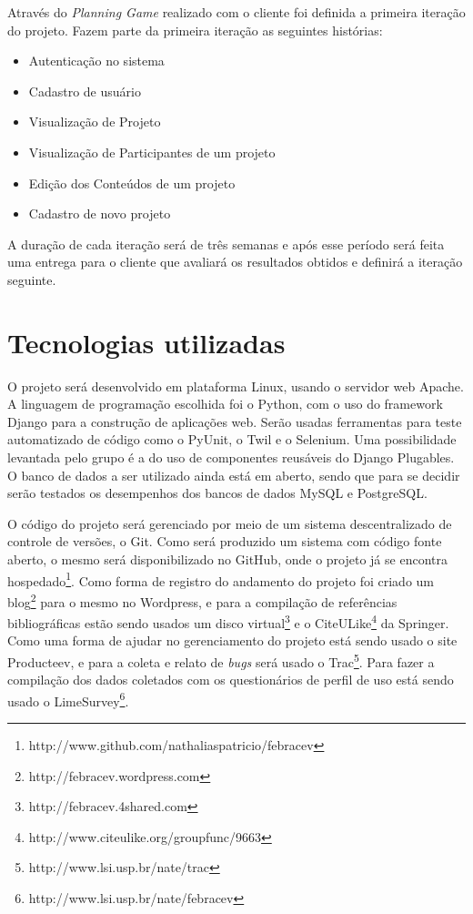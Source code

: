 \documentclass[a4paper,12pt,font=plain,header=plain]{abnt}
\begin{document}
    Através do \textit{Planning Game} realizado com o cliente foi definida a primeira iteração do projeto. Fazem parte da primeira iteração as seguintes histórias:

  \begin{itemize}
    \item Autenticação no sistema
    \item Cadastro de usuário
    \item Visualização de Projeto
    \item Visualização de Participantes de um projeto
    \item Edição dos Conteúdos de um projeto
    \item Cadastro de novo projeto
  \end{itemize}

	A duração de cada iteração será de três semanas e após esse período será feita uma entrega para o cliente que avaliará os resultados obtidos e definirá a iteração seguinte.

	\chapter{Tecnologias utilizadas}

	O projeto será desenvolvido em plataforma Linux, usando o servidor web Apache. A linguagem de programação escolhida foi o Python, com o uso do framework Django para a construção de aplicações web. Serão usadas ferramentas para teste automatizado de código como o PyUnit, o Twil e o Selenium. Uma possibilidade levantada pelo grupo é a do uso de componentes reusáveis do Django Plugables. O banco de dados a ser utilizado ainda está em aberto, sendo que para se decidir serão testados os desempenhos dos bancos de dados MySQL e PostgreSQL.

	O código do projeto será gerenciado por meio de um sistema descentralizado de controle de versões, o Git. Como será produzido um sistema com código fonte aberto, o mesmo será disponibilizado no GitHub, onde o projeto já se encontra hospedado\footnote{http://www.github.com/nathaliaspatricio/febracev}. Como forma de registro do andamento do projeto foi criado um blog\footnote{http://febracev.wordpress.com} para o mesmo no Wordpress, e para a compilação de referências bibliográficas estão sendo usados um disco virtual\footnote{http://febracev.4shared.com} e o CiteULike\footnote{http://www.citeulike.org/groupfunc/9663} da Springer. Como uma forma de ajudar no gerenciamento do projeto está sendo usado o site Producteev, e para a coleta e relato de \textit{bugs} será usado o Trac\footnote{http://www.lsi.usp.br/nate/trac}. Para fazer a compilação dos dados coletados com os questionários de perfil de uso está sendo usado o LimeSurvey\footnote{http://www.lsi.usp.br/nate/febracev}.
\end{document}
